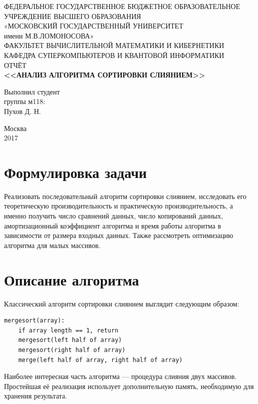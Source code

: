 \documentclass[14pt]{extarticle}
\begin{document}
\begin{titlepage}
	\begin{center}
		\small{ФЕДЕРАЛЬНОЕ ГОСУДАРСТВЕННОЕ БЮДЖЕТНОЕ ОБРАЗОВАТЕЛЬНОЕ}\\ 
			УЧРЕЖДЕНИЕ ВЫСШЕГО ОБРАЗОВАНИЯ\\
			«МОСКОВСКИЙ ГОСУДАРСТВЕННЫЙ УНИВЕРСИТЕТ\\
			имени М.В.ЛОМОНОСОВА»\\
		\hfill \break
		ФАКУЛЬТЕТ ВЫЧИСЛИТЕЛЬНОЙ МАТЕМАТИКИ И КИБЕРНЕТИКИ\\
		КАФЕДРА СУПЕРКОМПЬЮТЕРОВ И КВАНТОВОЙ ИНФОРМАТИКИ\\
		\vfill
		ОТЧЁТ \\
		\textbf{<<АНАЛИЗ АЛГОРИТМА СОРТИРОВКИ СЛИЯНИЕМ>>}\\
	\end{center}	
	\vfill
	\begin{flushright}
		Выполнил студент \\
		группы м118:\\
		Пухов Д. Н.\\
		{\hspace{3cm}}
	\end{flushright}
	
	
	\begin{center}
		Москва \\
		2017 
	\end{center}
	
	\thispagestyle{empty}

\end{titlepage}



\section*{Формулировка задачи} 
Реализовать последовательный алгоритм сортировки слиянием, исследовать его теоретическую производительность и практическую производительность, а именно получить число сравнений данных, число копирований данных, амортизационный коэффициент алгоритма и время работы алгоритма в зависимости от размера входных данных. Также рассмотреть оптимизацию алгоритма для малых массивов.

\section*{Описание алгоритма}
Классический алгоритм сортировки слиянием выглядит следующим образом:

\begin{lstlisting}
mergesort(array):
	if array length == 1, return
	mergesort(left half of array)
	mergesort(right half of array)
	merge(left half of array, right half of array)
\end{lstlisting}
Наиболее интересная часть алгоритма --- процедура слияния двух массивов. Простейшая её реализация использует дополнительную память, необходимую для хранения результата.
\end{document}
